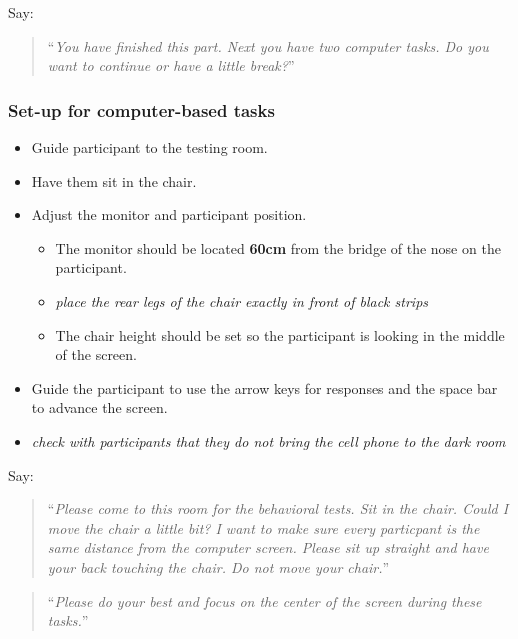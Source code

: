 \documentclass[]{article}
\providecommand{\tightlist}{%
  \setlength{\itemsep}{0pt}\setlength{\parskip}{0pt}}
\begin{document}
Say:

\begin{quote}
``\emph{You have finished this part. Next you have two computer tasks.
Do you want to continue or have a little break?}''
\end{quote}

\subsubsection{Set-up for computer-based
tasks}\label{set-up-for-computer-based-tasks-1}

\begin{itemize}
\tightlist
\item
  Guide participant to the testing room.
\item
  Have them sit in the chair.
\item
  Adjust the monitor and participant position.

  \begin{itemize}
  \tightlist
  \item
    The monitor should be located \textbf{60cm} from the bridge of the
    nose on the participant.
  \item
    \emph{place the rear legs of the chair exactly in front of black
    strips}
  \item
    The chair height should be set so the participant is looking in the
    middle of the screen.
  \end{itemize}
\item
  Guide the participant to use the arrow keys for responses and the
  space bar to advance the screen.
\item
  \emph{check with participants that they do not bring the cell phone to
  the dark room}
\end{itemize}

Say:

\begin{quote}
``\emph{Please come to this room for the behavioral tests. Sit in the
chair. Could I move the chair a little bit? I want to make sure every
particpant is the same distance from the computer screen. Please sit up
straight and have your back touching the chair. Do not move your
chair.}''
\end{quote}

\begin{quote}
``\emph{Please do your best and focus on the center of the screen during
these tasks.}''
\end{quote}
\end{document}
